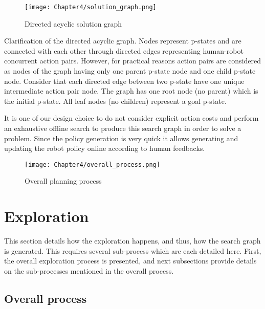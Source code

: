 \begin{figure}
    \centering
    \texttt{[image: Chapter4/solution\_graph.png]}
    \caption{Directed acyclic solution graph}
    \label{fig:solution_graph}
\end{figure}

Clarification of the directed acyclic graph. Nodes represent p-states and are connected with each other through directed edges representing human-robot concurrent action pairs. However, for practical reasons action pairs are considered as nodes of the graph having only one parent p-state node and one child p-state node. Consider that each directed edge between two p-state have one unique intermediate action pair node. The graph has one root node (no parent) which is the initial p-state. All leaf nodes (no children) represent a goal p-state. 

It is one of our design choice to do not consider explicit action costs and perform an exhaustive offline search to produce this search graph in order to solve a problem. Since the policy generation is very quick it allows generating and updating the robot policy online according to human feedbacks. 


\begin{figure}
    \texttt{[image: Chapter4/overall\_process.png]}
    \caption{Overall planning process}
    \label{fig:overall_process}
\end{figure}




\section{Exploration}

This section details how the exploration happens, and thus, how the search graph is generated. This requires several sub-process which are each detailed here. First, the overall exploration process is presented, and next subsections provide details on the sub-processes mentioned in the overall process.

    \subsection{Overall process}


